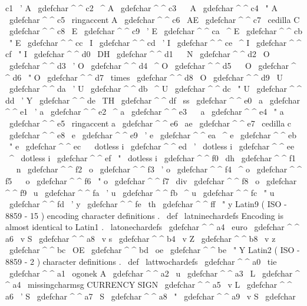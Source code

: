 {{{{{c1
{
\
'
A
}
\
gdefchar
^
^
c2
{
\
^
A
}
\
gdefchar
^
^
c3
{
\
~
A
}
\
gdefchar
^
^
c4
{
\
"
A
}
\
gdefchar
^
^
c5
{
\
ringaccent
A
}
\
gdefchar
^
^
c6
{
\
AE
}
\
gdefchar
^
^
c7
{
\
cedilla
C
}
\
gdefchar
^
^
c8
{
\
E
}
\
gdefchar
^
^
c9
{
\
'
E
}
\
gdefchar
^
^
ca
{
\
^
E
}
\
gdefchar
^
^
cb
{
\
"
E
}
\
gdefchar
^
^
cc
{
\
I
}
\
gdefchar
^
^
cd
{
\
'
I
}
\
gdefchar
^
^
ce
{
\
^
I
}
\
gdefchar
^
^
cf
{
\
"
I
}
%
\
gdefchar
^
^
d0
{
\
DH
}
\
gdefchar
^
^
d1
{
\
~
N
}
\
gdefchar
^
^
d2
{
\
O
}
\
gdefchar
^
^
d3
{
\
'
O
}
\
gdefchar
^
^
d4
{
\
^
O
}
\
gdefchar
^
^
d5
{
\
~
O
}
\
gdefchar
^
^
d6
{
\
"
O
}
\
gdefchar
^
^
d7
{
\
times
}
\
gdefchar
^
^
d8
{
\
O
}
\
gdefchar
^
^
d9
{
\
U
}
\
gdefchar
^
^
da
{
\
'
U
}
\
gdefchar
^
^
db
{
\
^
U
}
\
gdefchar
^
^
dc
{
\
"
U
}
\
gdefchar
^
^
dd
{
\
'
Y
}
\
gdefchar
^
^
de
{
\
TH
}
\
gdefchar
^
^
df
{
\
ss
}
%
\
gdefchar
^
^
e0
{
\
a
}
\
gdefchar
^
^
e1
{
\
'
a
}
\
gdefchar
^
^
e2
{
\
^
a
}
\
gdefchar
^
^
e3
{
\
~
a
}
\
gdefchar
^
^
e4
{
\
"
a
}
\
gdefchar
^
^
e5
{
\
ringaccent
a
}
\
gdefchar
^
^
e6
{
\
ae
}
\
gdefchar
^
^
e7
{
\
cedilla
c
}
\
gdefchar
^
^
e8
{
\
e
}
\
gdefchar
^
^
e9
{
\
'
e
}
\
gdefchar
^
^
ea
{
\
^
e
}
\
gdefchar
^
^
eb
{
\
"
e
}
\
gdefchar
^
^
ec
{
\
{
\
dotless
i
}
}
\
gdefchar
^
^
ed
{
\
'
{
\
dotless
i
}
}
\
gdefchar
^
^
ee
{
\
^
{
\
dotless
i
}
}
\
gdefchar
^
^
ef
{
\
"
{
\
dotless
i
}
}
%
\
gdefchar
^
^
f0
{
\
dh
}
\
gdefchar
^
^
f1
{
\
~
n
}
\
gdefchar
^
^
f2
{
\
o
}
\
gdefchar
^
^
f3
{
\
'
o
}
\
gdefchar
^
^
f4
{
\
^
o
}
\
gdefchar
^
^
f5
{
\
~
o
}
\
gdefchar
^
^
f6
{
\
"
o
}
\
gdefchar
^
^
f7
{
\
div
}
\
gdefchar
^
^
f8
{
\
o
}
\
gdefchar
^
^
f9
{
\
u
}
\
gdefchar
^
^
fa
{
\
'
u
}
\
gdefchar
^
^
fb
{
\
^
u
}
\
gdefchar
^
^
fc
{
\
"
u
}
\
gdefchar
^
^
fd
{
\
'
y
}
\
gdefchar
^
^
fe
{
\
th
}
\
gdefchar
^
^
ff
{
\
"
y
}
}
%
Latin9
(
ISO
-
8859
-
15
)
encoding
character
definitions
.
\
def
\
latninechardefs
{
%
%
Encoding
is
almost
identical
to
Latin1
.
\
latonechardefs
%
\
gdefchar
^
^
a4
{
\
euro
{
}
}
\
gdefchar
^
^
a6
{
\
v
S
}
\
gdefchar
^
^
a8
{
\
v
s
}
\
gdefchar
^
^
b4
{
\
v
Z
}
\
gdefchar
^
^
b8
{
\
v
z
}
\
gdefchar
^
^
bc
{
\
OE
}
\
gdefchar
^
^
bd
{
\
oe
}
\
gdefchar
^
^
be
{
\
"
Y
}
}
%
Latin2
(
ISO
-
8859
-
2
)
character
definitions
.
\
def
\
lattwochardefs
{
%
\
gdefchar
^
^
a0
{
\
tie
}
\
gdefchar
^
^
a1
{
\
ogonek
{
A
}
}
\
gdefchar
^
^
a2
{
\
u
{
}
}
\
gdefchar
^
^
a3
{
\
L
}
\
gdefchar
^
^
a4
{
\
missingcharmsg
{
CURRENCY
SIGN
}
}
\
gdefchar
^
^
a5
{
\
v
L
}
\
gdefchar
^
^
a6
{
\
'
S
}
\
gdefchar
^
^
a7
{
\
S
}
\
gdefchar
^
^
a8
{
\
"
{
}
}
\
gdefchar
^
^
a9
{
\
v
S
}
\
gdefchar
}}}}}
